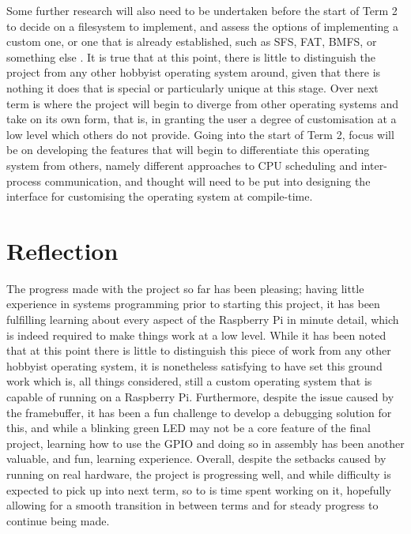 \documentclass[10pt,a4paper]{article}
\begin{document}
Some further research will also need to be undertaken before the start of Term 2
to decide on a filesystem to implement, and assess the options of implementing a
custom one, or one that is already established, such as SFS, FAT, BMFS, or
something else \cite{Filesystems}. It is true that at this point, there is
little to distinguish the project from any other hobbyist operating system
around, given that there is nothing it does that is special or particularly
unique at this stage. Over next term is where the project will begin to diverge
from other operating systems and take on its own form, that is, in granting the
user a degree of customisation at a low level which others do not provide. Going
into the start of Term 2, focus will be on developing the features that will
begin to differentiate this operating system from others, namely different
approaches to CPU scheduling and inter-process communication, and thought will
need to be put into designing the interface for customising the operating system
at compile-time.

\section*{Reflection}
The progress made with the project so far has been pleasing; having little
experience in systems programming prior to starting this project, it has been
fulfilling learning about every aspect of the Raspberry Pi in minute detail,
which is indeed required to make things work at a low level. While it has been
noted that at this point there is little to distinguish this piece of work from
any other hobbyist operating system, it is nonetheless satisfying to have set
this ground work which is, all things considered, still a custom operating
system that is capable of running on a Raspberry Pi. Furthermore, despite the
issue caused by the framebuffer, it has been a fun challenge to develop a
debugging solution for this, and while a blinking green LED may not be a core
feature of the final project, learning how to use the GPIO and doing so in
assembly has been another valuable, and fun, learning experience. Overall,
despite the setbacks caused by running on real hardware, the project is
progressing well, and while difficulty is expected to pick up into next term, so
to is time spent working on it, hopefully allowing for a smooth transition in
between terms and for steady progress to continue being made.
\end{document}
